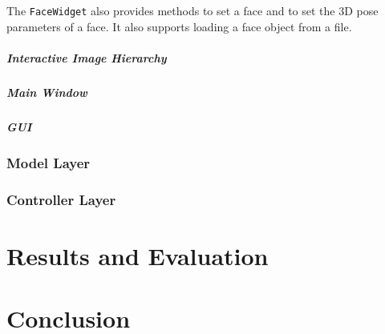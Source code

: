 \documentclass[11pt,a4paper]{report}
\begin{document}
The \texttt{FaceWidget} also provides methods to set a face and to set the 3D
pose parameters of a face. It also supports loading a face object from a file.
\paragraph{Interactive Image Hierarchy}

\paragraph{Main Window}

\paragraph{GUI}

\subsection{Model Layer}
\subsection{Controller Layer}


\chapter{Results and Evaluation}

\chapter{Conclusion}




\end{document}
